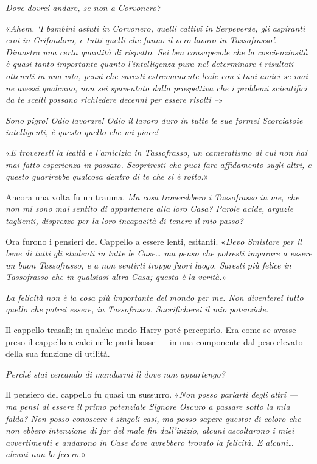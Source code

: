 \textit{Dove dovrei andare, se non a Corvonero?}

«\textit{Ahem. ‘I bambini astuti in Corvonero, quelli cattivi in Serpeverde, gli aspiranti eroi in Grifondoro, e tutti quelli che fanno il vero lavoro in Tassofrasso’. Dimostra una certa quantità di rispetto. Sei ben consapevole che la coscienziosità è quasi tanto importante quanto l’intelligenza pura nel determinare i risultati ottenuti in una vita, pensi che saresti estremamente leale con i tuoi amici se mai ne avessi qualcuno, non sei spaventato dalla prospettiva che i problemi scientifici da te scelti possano richiedere decenni per essere risolti –}»

\textit{Sono pigro! Odio lavorare! Odio il lavoro duro in tutte le sue forme! Scorciatoie intelligenti, è questo quello che mi piace!}

«\textit{E troveresti la lealtà e l’amicizia in Tassofrasso, un cameratismo di cui non hai mai fatto esperienza in passato. Scopriresti che puoi fare affidamento sugli altri, e questo guarirebbe qualcosa dentro di te che si è rotto.}»

Ancora una volta fu un trauma. \textit{Ma cosa troverebbero i Tassofrasso in me, che non mi sono mai sentito di appartenere alla loro Casa? Parole acide, arguzie taglienti, disprezzo per la loro incapacità di tenere il mio passo?}

Ora furono i pensieri del Cappello a essere lenti, esitanti. «\textit{Devo Smistare per il bene di tutti gli studenti in tutte le Case… ma penso che potresti imparare a essere un buon Tassofrasso, e a non sentirti troppo fuori luogo. Saresti più felice in Tassofrasso che in qualsiasi altra Casa; questa è la verità.}»

\textit{La felicità non è la cosa più importante del mondo per me. Non diventerei tutto quello che potrei essere, in Tassofrasso. Sacrificherei il mio potenziale.}

Il cappello trasalì; in qualche modo Harry poté percepirlo. Era come se avesse preso il cappello a calci nelle parti basse — in una componente dal peso elevato della sua funzione di utilità.

\textit{Perché stai cercando di mandarmi lì dove non appartengo?}

Il pensiero del cappello fu quasi un sussurro. «\textit{Non posso parlarti degli altri — ma pensi di essere il primo potenziale Signore Oscuro a passare sotto la mia falda? Non posso conoscere i singoli casi, ma posso sapere questo: di coloro che non ebbero intenzione di far del male fin dall’inizio, alcuni ascoltarono i miei avvertimenti e andarono in Case dove avrebbero trovato la felicità. E alcuni… alcuni non lo fecero.}»


